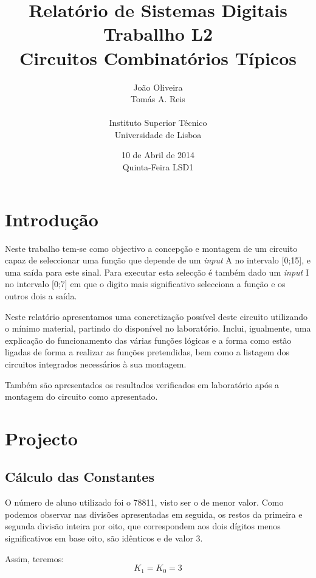 \documentclass[a4paper,12pt]{article}
\begin{document}
\renewcommand{\sfdefault}{lmss}
\renewcommand{\familydefault}{\sfdefault}
\selectfont

\title{\bf Relatório de Sistemas Digitais \\
Traballho L2\\
Circuitos Combinatórios Típicos}
\author{João Oliveira\\
Tomás A. Reis\\
\\
Instituto Superior Técnico \\
Universidade de Lisboa}
\date{10 de Abril de 2014 \\
Quinta-Feira LSD1}
\maketitle

\pagebreak
\section{Introdução}
Neste trabalho tem-se como objectivo a concepção e montagem de um circuito capaz de seleccionar uma função que depende de um {\it input} A no intervalo [0;15], e uma saída para este sinal. Para executar esta selecção é também dado um {\it input} I no intervalo [0;7] em que o digito mais significativo selecciona a função e os outros dois a saída. 
\par
Neste relatório apresentamos uma concretização possível deste circuito utilizando o mínimo material, partindo do disponível no laboratório. Inclui, igualmente, uma explicação do funcionamento das várias funções lógicas e a forma como estão ligadas de forma a realizar as funções pretendidas, bem como a listagem dos circuitos integrados necessários à sua montagem.
\par
Também são apresentados os resultados verificados em laboratório após a montagem do circuito como apresentado.

\section{Projecto}
\subsection{Cálculo das Constantes}
O número de aluno utilizado foi o 78811, visto ser o de menor valor. Como 
podemos observar nas divisões apresentadas em seguida, os restos da primeira e 
segunda divisão inteira por oito, que correspondem aos dois dígitos menos 
significativos em base oito, são idênticos e de valor 3. 
\par
\vspace*{1\baselineskip}
\hspace{20pt}  \hspace{60pt} 
\vspace*{1\baselineskip}
\par
Assim, teremos:
\begin{equation}
K_1=K_0=3
\end{equation}
\end{document}
